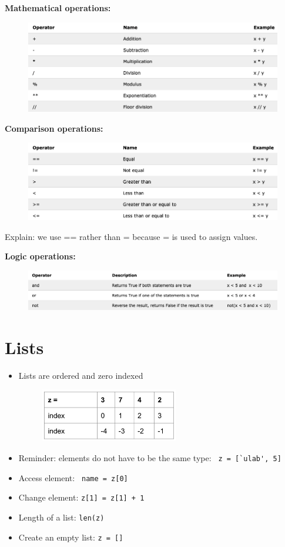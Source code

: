 \documentclass[12pt]{article}
\numberwithin{equation}{section}
\begin{document}
\textbf{Mathematical operations:}
\begin{figure}[H]
	\centering
	\includegraphics[width=15cm] {math}
\end{figure}

\textbf{Comparison operations: }
\begin{figure}[H]
	\centering
	\includegraphics[width=15cm] {comp}
\end{figure}
Explain: we use == rather than = because = is used to assign values.

\textbf{Logic operations: }
\begin{figure}[H]
	\centering
	\includegraphics[width=15cm] {logic}
\end{figure}

\section{Lists}
\begin{itemize}
    \item Lists are ordered and zero indexed
    \begin{figure}[H]
	    \centering
	    \includegraphics[width=6cm] {index}
    \end{figure}
    \item Reminder: elements do not have to be the same type: \verb| z = [`ulab', 5]|
    \item Access element: \verb| name = z[0]|
    \item Change element: \verb|z[1] = z[1] + 1|
    \item Length of a list: \verb|len(z)|
    \item Create an empty list: \verb|z = []|
\end{itemize}
\end{document}
